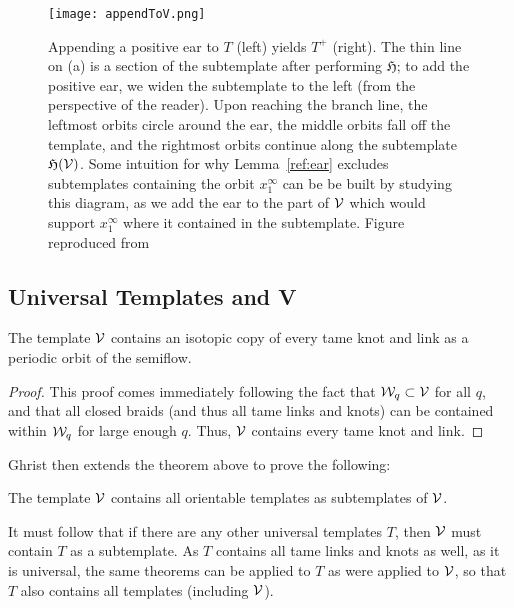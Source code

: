 \documentclass[paper.tex]{subfiles}
\begin{document}
\begin{figure}[h]
    \centering
    \texttt{[image: appendToV.png]}
    \caption{Appending a positive ear to $T$ (left) yields $T^+$ (right). The thin line on (a) is a section of the subtemplate after performing $\mathfrak{H}$; to add the positive ear,
      we widen the subtemplate to the left (from the perspective of the reader). Upon reaching the branch line, the leftmost orbits circle around the ear, the middle orbits fall off the template, and the
      rightmost orbits continue along  the subtemplate $\mathfrak{H}(\mathcal{V})$.
      Some intuition for why Lemma~\ref{ref:ear} excludes subtemplates containing the orbit $x_1^\infty$ can be be built by studying this diagram, as we add the ear to the part of $\mathcal{V}$ which would support $x_1^\infty$
      where it contained in the subtemplate.
      Figure reproduced from~\cite{Ghrist1996}}\label{fig:appendToV}
\end{figure}



\subsection{Universal Templates and V}

\begin{thm}[Ghrist 1996]
    The template $\mathcal{V}$ contains an isotopic copy of every tame knot and link as a periodic orbit of the semiflow.
\end{thm}
\begin{proof}
    This proof comes immediately following the fact that $\mathcal{W}_q \subset \mathcal{V}$ for all $q$, and that all closed braids (and thus all tame links and knots) can be contained within $\mathcal{W}_q$ for large enough $q$. Thus, $\mathcal{V}$ contains every tame knot and link.
\end{proof}


Ghrist then extends the theorem above to prove the following:

\begin{thm}[Ghrist 1996]
    The template $\mathcal{V}$ contains all orientable templates as subtemplates of $\mathcal{V}$.
\end{thm}

It must follow that if there are any other universal templates $T$, then $\mathcal{V}$ must contain $T$ as a subtemplate. As $T$ contains all tame links and knots as well, as it is universal, the same theorems can be applied to $T$ as were applied to $\mathcal{V}$, so that $T$ also contains all templates (including $\mathcal{V}$).
\end{document}
